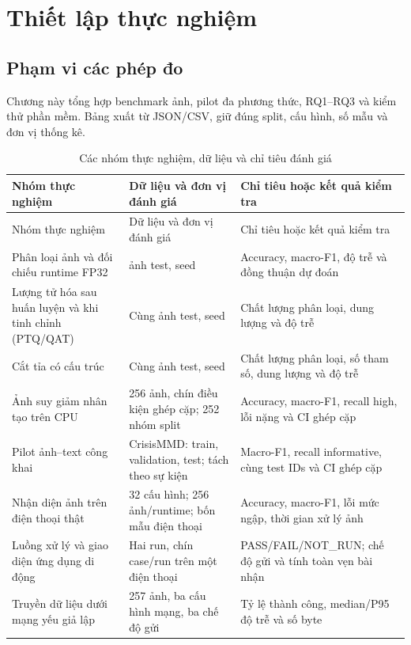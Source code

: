 \section{Thiết lập thực nghiệm}\label{sec:04-evaluation-setup}
\subsection{Phạm vi các phép đo}
Chương này tổng hợp benchmark ảnh, pilot đa phương thức, RQ1--RQ3 và kiểm thử phần mềm. Bảng xuất từ JSON/CSV, giữ đúng split, cấu hình, số mẫu và đơn vị thống kê.

\begin{longtable}{P{.28\textwidth}P{.30\textwidth}P{.31\textwidth}}
\caption{Các nhóm thực nghiệm, dữ liệu và chỉ tiêu đánh giá}\label{tab:experiment-map}\\
\toprule Nhóm thực nghiệm & Dữ liệu và đơn vị đánh giá & Chỉ tiêu hoặc kết quả kiểm tra \\\midrule\endfirsthead
\toprule Nhóm thực nghiệm & Dữ liệu và đơn vị đánh giá & Chỉ tiêu hoặc kết quả kiểm tra \\\midrule\endhead
Phân loại ảnh và đối chiếu runtime FP32 & \ImageTest{} ảnh test, seed \BenchmarkSeed{} & Accuracy, macro-F1, độ trễ và đồng thuận dự đoán \\
Lượng tử hóa sau huấn luyện và khi tinh chỉnh (PTQ/QAT) & Cùng \ImageTest{} ảnh test, seed \QuantizationSeed{} & Chất lượng phân loại, dung lượng và độ trễ \\
Cắt tỉa có cấu trúc & Cùng \ImageTest{} ảnh test, seed \PruningSeed{} & Chất lượng phân loại, số tham số, dung lượng và độ trễ \\
Ảnh suy giảm nhân tạo trên CPU & 256 ảnh, chín điều kiện ghép cặp; 252 nhóm split & Accuracy, macro-F1, recall high, lỗi nặng và CI ghép cặp \\
Pilot ảnh--text công khai & CrisisMMD: \MMTrainN{} train, \MMDevN{} validation, \MMTestN{} test; tách theo sự kiện & Macro-F1, recall informative, cùng test IDs và CI ghép cặp \\
Nhận diện ảnh trên điện thoại thật & 32 cấu hình; 256 ảnh/runtime; bốn mẫu điện thoại & Accuracy, macro-F1, lỗi mức ngập, thời gian xử lý ảnh \\
Luồng xử lý và giao diện ứng dụng di động & Hai run, chín case/run trên một điện thoại & PASS/FAIL/NOT\_RUN; chế độ gửi và tính toàn vẹn bài nhận \\
Truyền dữ liệu dưới mạng yếu giả lập & 257 ảnh, ba cấu hình mạng, ba chế độ gửi & Tỷ lệ thành công, median/P95 độ trễ và số byte \\

\end{longtable}
